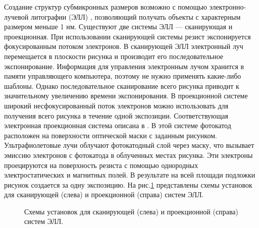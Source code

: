 Создание структур субмикронных размеров возможно с помощью электронно-лучевой литографии (ЭЛЛ) \cite{SPIEnanofabrication}, позволяющий получать объекты с характерным размером меньше 1 нм. Существуют две системы ЭЛЛ --- сканирующая и проекционная. При использовании сканирующей системы резист экспонируется фокусированным потоком электронов. В сканирующей ЭЛЛ электронный луч перемещается в плоскости рисунка и производит его последовательное экспонирование. Информация для управления электронным лучом хранится в памяти управляющего компьютера, поэтому не нужно применять какие-либо шаблоны. Однако последовательное сканирование всего рисунка приводит к значительному увеличению времени экспонирования. В проекционной системе широкий несфокусированный поток электронов можно использовать для получения всего рисунка в течение одной экспозиции. Соответствующая электронная проекционная система описана в \cite{projectelectron}. В этой системе фотокатод расположен на поверхности оптической маски с заданным рисунком. Ультрафиолетовые лучи облучают фотокатодный слой через маску, что вызывает эмиссию электронов с фотокатода в облученных местах рисунка. Эти электроны проецируются на поверхность резиста с помощью однородных электростатических и магнитных полей. В результате на всей площади подложки рисунок создается за одну экспозицию. На рис.\ref{img:EBLscheme} представлены схемы установок для сканирующей (слева) и проекционной (справа) систем ЭЛЛ. 

\begin{figure}
\caption{Схемы установок для сканирующей (слева) и проекционной (справа) систем ЭЛЛ\cite{nanotechnologybook}.}
\label{img:EBLscheme}
\end{figure}

